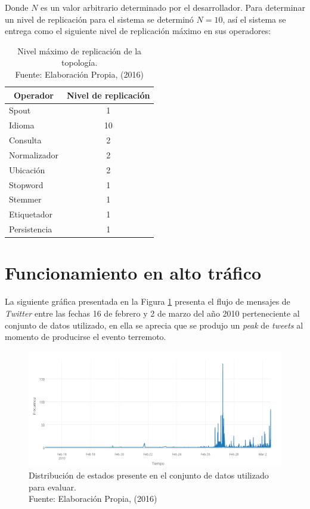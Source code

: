 Donde $N$ es un valor arbitrario determinado por el desarrollador. Para determinar un nivel de replicación para el sistema se determinó $N = 10$, así el sistema se entrega como el siguiente nivel de replicación máximo en sus operadores:

\begin{table}[H]
\centering
\caption[Nivel máximo de replicación de la topología.]{Nivel máximo de replicación de la topología.\\Fuente: Elaboración Propia, (2016)}
\label{tab:topologiaFinal}
\begin{tabular}{|l|c|}
\hline
\multicolumn{1}{|c|}{\textbf{Operador}} & \textbf{Nivel de replicación} \\ \hline
Spout & 1 \\ \hline
Idioma & 10 \\ \hline
Consulta & 2 \\ \hline
Normalizador & 2 \\ \hline
Ubicación & 2 \\ \hline
Stopword & 1 \\ \hline
Stemmer & 1 \\ \hline
Etiquetador & 1 \\ \hline
Persistencia & 1 \\ \hline
\end{tabular}
\end{table} 

\section{Funcionamiento en alto tráfico}
\label{sec:AltoTrafico}

La siguiente gráfica presentada en la Figura \ref{fig:graficoDeTweets} presenta el flujo de mensajes de \textit{Twitter} entre las fechas 16 de febrero y 2 de marzo del año 2010 perteneciente al conjunto de datos utilizado, en ella se aprecia que se produjo un \textit{peak} de \textit{tweets} al momento de producirse el evento terremoto.

\begin{figure}[H]
        \centering
        \captionsetup{justification=centering}
        \includegraphics[scale=0.6]{images/GraficoTweetsHastaEventoZoom1.png}
        \caption[Distribución de eventos presente en el conjunto de datos utilizado para evaluar.]{Distribución de estados presente en el conjunto de datos utilizado para evaluar.\\Fuente: Elaboración Propia, (2016)}
        \label{fig:graficoDeTweets}
\end{figure}

